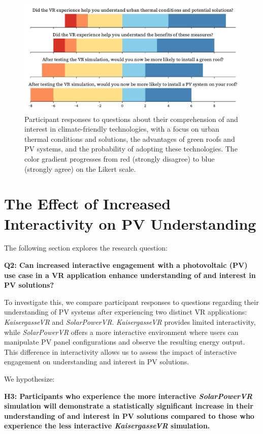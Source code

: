 \documentclass[draft, final]{vutinfth} %
\begin{document}
\begin{figure}[h]
    \centering
    \includegraphics[width=\textwidth]{graphics/research-1.pdf}
    \caption{Participant responses to questions about their comprehension of and interest in climate-friendly technologies, with a focus on urban thermal conditions and solutions, the advantages of green roofs and PV systems, and the probability of adopting these technologies. The color gradient progresses from red (strongly disagree) to blue (strongly agree) on the Likert scale.}
    \label{fig:research-1}
\end{figure}

\section{The Effect of Increased Interactivity on PV Understanding}

The following section explores the research question:

\textbf{Q2: Can increased interactive engagement with a photovoltaic (PV) use case in a VR application enhance understanding of and interest in PV solutions?}

To investigate this, we compare participant responses to questions regarding their understanding of PV systems after experiencing two distinct VR applications: \textit{KaisergasseVR} and \textit{SolarPowerVR}. \textit{KaisergasseVR} provides  limited interactivity, while \textit{SolarPowerVR} offers a more interactive environment where users can manipulate PV panel configurations and observe the resulting energy output. This difference in interactivity allows us to assess the impact of interactive engagement on understanding and interest in PV solutions.

We hypothesize:

\textbf{H3: Participants who experience the more interactive \textit{SolarPowerVR} simulation will demonstrate a statistically significant increase in their understanding of and interest in PV solutions compared to those who experience the less interactive \textit{KaisergasseVR} simulation.}
\end{document}
